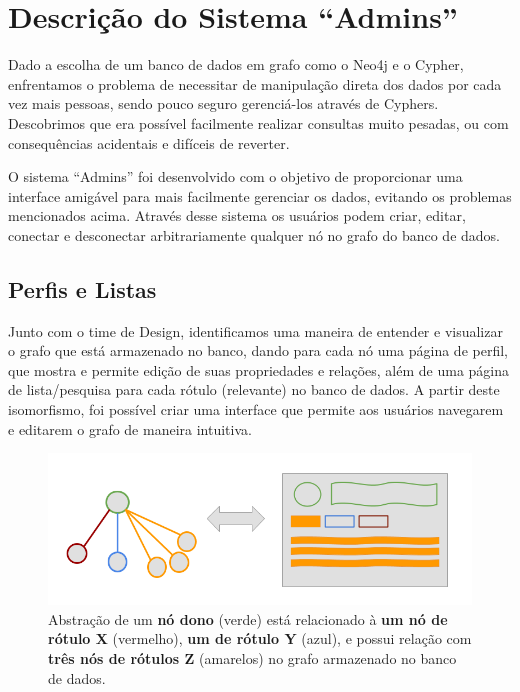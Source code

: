 \chapter{Descrição do Sistema ``Admins''}
\label{chap4}

Dado a escolha de um banco de dados em grafo como o Neo4j e o Cypher, enfrentamos o problema de necessitar de manipulação direta dos dados por cada vez mais pessoas, sendo pouco seguro gerenciá-los através de Cyphers. Descobrimos que era possível facilmente realizar consultas muito pesadas, ou com consequências acidentais e difíceis de reverter.

O sistema ``Admins'' foi desenvolvido com o objetivo de proporcionar uma interface amigável para mais facilmente gerenciar os dados, evitando os problemas mencionados acima. Através desse sistema os usuários podem criar, editar, conectar e desconectar arbitrariamente qualquer nó no grafo do banco de dados.

\section{Perfis e Listas}

Junto com o time de Design, identificamos uma maneira de entender e visualizar o grafo que está armazenado no banco, dando para cada nó uma página de perfil, que mostra e permite edição de suas propriedades e relações, além de uma página de lista/pesquisa para cada rótulo (relevante) no banco de dados. A partir deste isomorfismo, foi possível criar uma interface que permite aos usuários navegarem e editarem o grafo de maneira intuitiva.

\begin{figure}[H]
    \centering
    \includegraphics[width=1.0\linewidth]{Imagens/chap04/perfil-isomorfismo.png}
    \caption{Abstração de um \textbf{nó dono} (verde) está relacionado à \textbf{um nó de rótulo X} (vermelho), \textbf{um de rótulo Y} (azul), e possui relação com \textbf{três nós de rótulos Z} (amarelos) no grafo armazenado no banco de dados.}
    \label{fig:isomorphism}
\end{figure}

